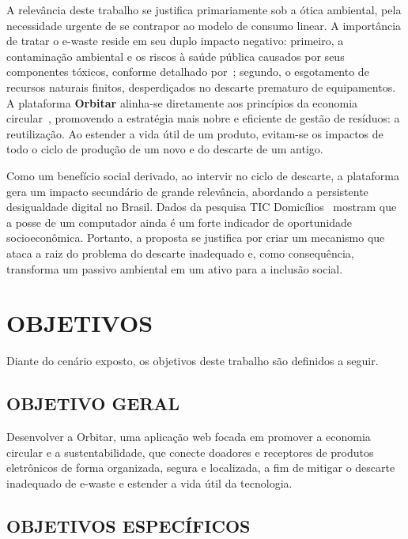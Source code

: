 \documentclass[
	12pt,				%
	openright,			%
	oneside,			%
	a4paper,			%
	english,			%
	brazil				%
	]{abntex2}
\theoremstyle{definition}
\begin{document}
A relevância deste trabalho se justifica primariamente sob a ótica ambiental, pela necessidade urgente de se contrapor ao modelo de consumo linear. A importância de tratar o e-waste reside em seu duplo impacto negativo: primeiro, a contaminação ambiental e os riscos à saúde pública causados por seus componentes tóxicos, conforme detalhado por~; segundo, o esgotamento de recursos naturais finitos, desperdiçados no descarte prematuro de equipamentos. A plataforma \textbf{Orbitar} alinha-se diretamente aos princípios da economia circular~\cite{ellen2023}, promovendo a estratégia mais nobre e eficiente de gestão de resíduos: a reutilização. Ao estender a vida útil de um produto, evitam-se os impactos de todo o ciclo de produção de um novo e do descarte de um antigo.

Como um benefício social derivado, ao intervir no ciclo de descarte, a plataforma gera um impacto secundário de grande relevância, abordando a persistente desigualdade digital no Brasil. Dados da pesquisa TIC Domicílios~\cite{cgi2024} mostram que a posse de um computador ainda é um forte indicador de oportunidade socioeconômica. Portanto, a proposta se justifica por criar um mecanismo que ataca a raiz do problema do descarte inadequado e, como consequência, transforma um passivo ambiental em um ativo para a inclusão social.

\section[OBJETIVOS]{OBJETIVOS}

Diante do cenário exposto, os objetivos deste trabalho são definidos a seguir.

\subsection[OBJETIVO GERAL]{OBJETIVO GERAL}

Desenvolver a Orbitar, uma aplicação web focada em promover a economia circular e a sustentabilidade, que conecte doadores e receptores de produtos eletrônicos de forma organizada, segura e localizada, a fim de mitigar o descarte inadequado de e-waste e estender a vida útil da tecnologia.

\subsection[OBJETIVOS ESPECÍFICOS]{OBJETIVOS ESPECÍFICOS}
\end{document}
